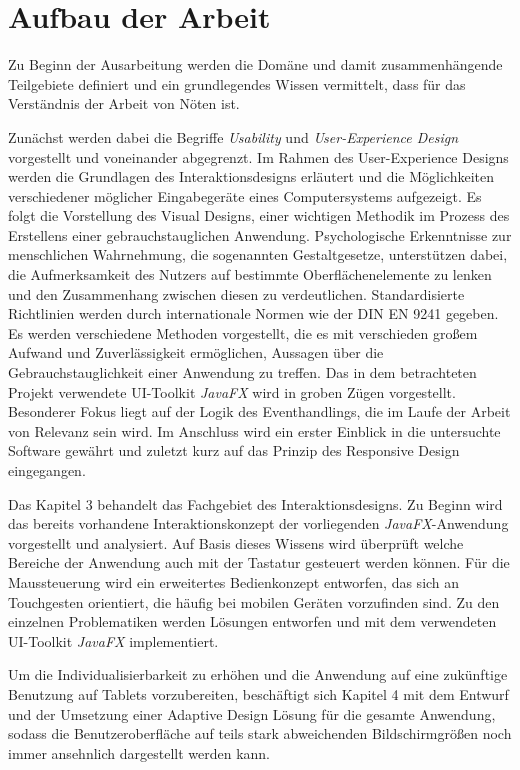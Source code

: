 \section{Aufbau der Arbeit} \label{sec:einlAufbau}
Zu Beginn der Ausarbeitung werden die Domäne und damit zusammenhängende Teilgebiete definiert und ein grundlegendes Wissen vermittelt, dass für das Verständnis der Arbeit von Nöten ist.\par
Zunächst werden dabei die Begriffe \textit{Usability} und \textit{User-Experience Design} vorgestellt und voneinander abgegrenzt. Im Rahmen des User-Experience Designs werden die Grundlagen des Interaktionsdesigns erläutert und die Möglichkeiten verschiedener möglicher Eingabegeräte eines Computersystems aufgezeigt. Es folgt die Vorstellung des Visual Designs, einer wichtigen Methodik im Prozess des Erstellens einer gebrauchstauglichen Anwendung. Psychologische Erkenntnisse zur menschlichen Wahrnehmung, die sogenannten Gestaltgesetze, unterstützen dabei, die Aufmerksamkeit des Nutzers auf bestimmte Oberflächenelemente zu lenken und den Zusammenhang zwischen diesen zu verdeutlichen. Standardisierte Richtlinien werden durch internationale Normen wie der DIN EN 9241 gegeben. Es werden verschiedene Methoden vorgestellt, die es mit verschieden großem Aufwand und Zuverlässigkeit ermöglichen, Aussagen über die Gebrauchstauglichkeit einer Anwendung zu treffen. Das in dem betrachteten Projekt verwendete UI-Toolkit \textit{JavaFX} wird in groben Zügen vorgestellt. Besonderer Fokus liegt auf der Logik des Eventhandlings, die im Laufe der Arbeit von Relevanz sein wird. Im Anschluss wird ein erster Einblick in die untersuchte Software gewährt und zuletzt kurz auf das Prinzip des Responsive Design eingegangen.\par
Das Kapitel 3 behandelt das Fachgebiet des Interaktionsdesigns. Zu Beginn wird das bereits vorhandene Interaktionskonzept der vorliegenden \textit{JavaFX}-Anwendung vorgestellt und analysiert. Auf Basis dieses Wissens wird überprüft welche Bereiche der Anwendung auch mit der Tastatur gesteuert werden können. Für die Maussteuerung wird ein erweitertes Bedienkonzept entworfen, das sich an Touchgesten orientiert, die häufig bei mobilen Geräten vorzufinden sind. Zu den einzelnen Problematiken werden Lösungen entworfen und mit dem verwendeten UI-Toolkit \textit{JavaFX} implementiert.\par
Um die Individualisierbarkeit zu erhöhen und die Anwendung auf eine zukünftige Benutzung auf Tablets vorzubereiten, beschäftigt sich Kapitel 4 mit dem Entwurf und der Umsetzung einer Adaptive Design Lösung für die gesamte Anwendung, sodass die Benutzeroberfläche auf teils stark abweichenden Bildschirmgrößen noch immer ansehnlich dargestellt werden kann.\par
